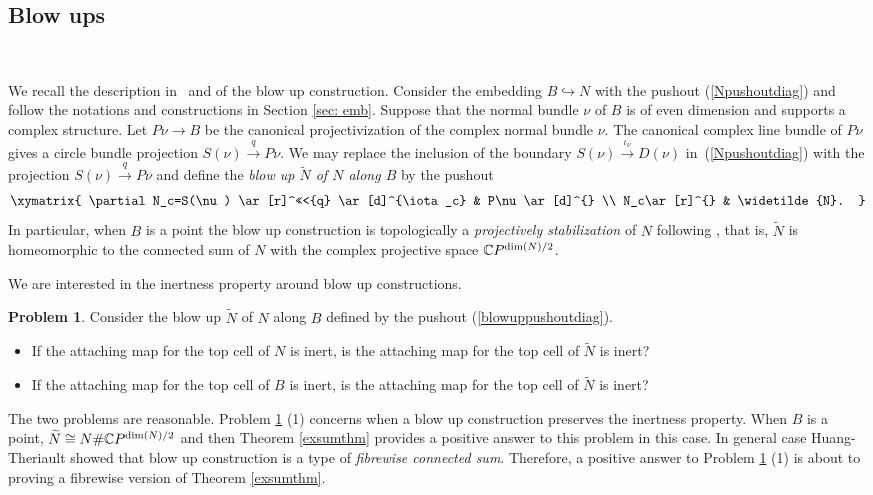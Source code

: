\documentclass[a4]{amsart}
\theoremstyle{definition}
\newtheorem{problem}[theorem]{Problem}
\begin{document}
\begin{sloppypar}
\subsection{Blow ups}

$\, $

We recall the description in~\cite[Section 2]{LS08} and \cite[Section 5]{HT24d} of the blow up construction. 
Consider the embedding $B\stackrel{}{\hookrightarrow}N$ with the pushout (\ref{Npushoutdiag}) and follow the notations and constructions in Section \ref{sec: emb}. 
Suppose that the normal bundle $\nu$ of $B$ is of even dimension and supports a complex structure. Let $P\nu \stackrel{}{\longrightarrow} B$ be the canonical projectivization of the complex normal bundle $\nu$. The canonical complex line bundle of $P\nu$ gives a circle bundle projection $S(\nu)\stackrel{q}{\longrightarrow} P\nu$. 
We may replace the inclusion of the boundary $S(\nu)\stackrel{\iota_{\nu}}{\longrightarrow} D(\nu)$ 
in~(\ref{Npushoutdiag}) with the projection $S(\nu)\stackrel{q}{\longrightarrow} P\nu$ and define the {\it blow up $\widetilde{N}$ of $N$ along $B$} by the pushout  
\begin{equation}
\begin{gathered}
\label{blowuppushoutdiag}
\xymatrix{
\partial N_c=S(\nu) \ar[r]^<<<{q} \ar[d]^{\iota_c} &
P\nu\ar[d]^{} \\
N_c\ar[r]^{} &
\widetilde{N}.
}
\end{gathered}
\end{equation}
In particular, when $B$ is a point the blow up construction is topologically a {\it projectively stabilization} of $N$ following \cite{HT24d}, that is, $\widetilde{N}$ is homeomorphic to the connected sum of $N$ with the complex projective space $\mathbb{C}P^{{\rm dim}(N)/2}$. 

We are interested in the inertness property around blow up constructions.
\begin{problem}\label{blowup-inert-prob}
Consider the blow up $\widetilde{N}$ of $N$ along $B$ defined by the pushout (\ref{blowuppushoutdiag}). 
\begin{itemize}
\item[(1).] If the attaching map for the top cell of $N$ is inert, is the attaching map for the top cell of $\widetilde{N}$ is inert?
\item[(2).] If the attaching map for the top cell of $B$ is inert, is the attaching map for the top cell of $\widetilde{N}$ is inert?
\end{itemize}
\end{problem} 
The two problems are reasonable. Problem \ref{blowup-inert-prob} (1) concerns when a blow up construction preserves the inertness property. When $B$ is a point, $\widetilde{N}\cong N\#\mathbb{C}P^{{\rm dim}(N)/2}$ and then Theorem \ref{exsumthm} provides a positive answer to this problem in this case. In general case Huang-Theriault \cite{HT24d} showed that blow up construction is a type of {\it fibrewise connected sum}. Therefore, a positive answer to Problem \ref{blowup-inert-prob} (1) is about to proving a fibrewise version of Theorem \ref{exsumthm}.  


\end{sloppypar}
\end{document}
